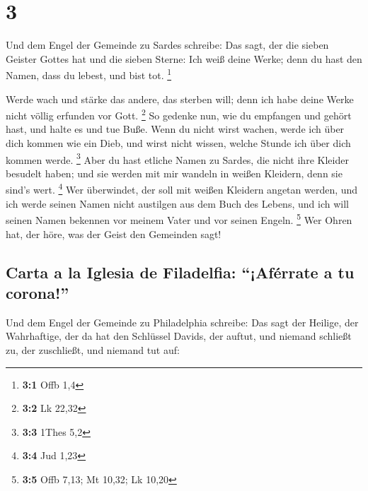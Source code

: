 \hypertarget{section-2}{%
\section{3}\label{section-2}}

 Und dem Engel der Gemeinde zu Sardes schreibe: Das sagt,
der die sieben Geister Gottes hat und die sieben Sterne: Ich weiß deine
Werke; denn du hast den Namen, dass du lebest, und bist tot. \footnote{\textbf{3:1}
  Offb 1,4}

 Werde wach und stärke das andere, das sterben will; denn
ich habe deine Werke nicht völlig erfunden vor Gott. \footnote{\textbf{3:2}
  Lk 22,32}  So gedenke nun, wie du empfangen und gehört
hast, und halte es und tue Buße. Wenn du nicht wirst wachen, werde ich
über dich kommen wie ein Dieb, und wirst nicht wissen, welche Stunde ich
über dich kommen werde. \footnote{\textbf{3:3} 1Thes 5,2} 
Aber du hast etliche Namen zu Sardes, die nicht ihre Kleider besudelt
haben; und sie werden mit mir wandeln in weißen Kleidern, denn sie
sind's wert. \footnote{\textbf{3:4} Jud 1,23}  Wer
überwindet, der soll mit weißen Kleidern angetan werden, und ich werde
seinen Namen nicht austilgen aus dem Buch des Lebens, und ich will
seinen Namen bekennen vor meinem Vater und vor seinen Engeln.
\footnote{\textbf{3:5} Offb 7,13; Mt 10,32; Lk 10,20}  Wer
Ohren hat, der höre, was der Geist den Gemeinden sagt!

\hypertarget{carta-a-la-iglesia-de-filadelfia-afuxe9rrate-a-tu-corona}{%
\subsection{Carta a la Iglesia de Filadelfia: ``¡Aférrate a tu
corona!''}\label{carta-a-la-iglesia-de-filadelfia-afuxe9rrate-a-tu-corona}}

 Und dem Engel der Gemeinde zu Philadelphia schreibe: Das
sagt der Heilige, der Wahrhaftige, der da hat den Schlüssel Davids, der
auftut, und niemand schließt zu, der zuschließt, und niemand tut auf:

